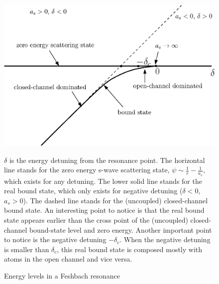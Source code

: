\documentclass[reprint,pra]{revtex4-1}
\newcommand{\nth}[1]{\ensuremath{\frac{1}{#1}}}
\begin{document}


\begin{figure}[htbp]
\begin{center}
\includegraphics[width=0.8\columnwidth]{levels}
\caption{Energy levels in a Feshbach resonance\label{fig:intro:levels}} 
\parbox{0.9\columnwidth}{\raggedright \small $\delta$ is the energy detuning from the resonance point.  The horizontal line stands for the zero energy s-wave scattering state, $\psi\sim\nth{r}-\nth{a_s}$, which exists for any detuning.  The lower solid line stands for the real bound state, which only exists for negative detuning ($\delta<0$, $a_s>0$). The dashed line stands for the (uncoupled) closed-channel bound state.  An interesting point to notice is that the real bound state appears earlier than the cross point of the (uncoupled) closed-channel bound-state level and zero energy. Another important point to notice is the negative detuning $-\delta_c$.  When the negative detuning is smaller than $\delta_c$, this real bound state is composed mostly with atoms in the open channel and vice versa.  %
}

\end{center}
\end{figure}
\end{document}
